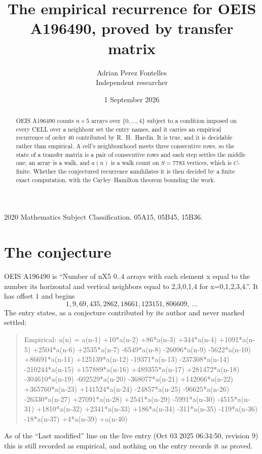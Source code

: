 \documentclass[11pt,a4paper]{article}
\title{The empirical recurrence for OEIS A196490, proved by transfer matrix}
\author{Adrian Perez Fontelles\\ \small Independent researcher}
\date{1 September 2026}
\theoremstyle{plain}
\theoremstyle{definition}
\begin{document}
\maketitle

\begin{abstract}
OEIS A196490 counts $n\times5$ arrays over $\{0,\dots,4\}$ subject to a condition imposed on
every CELL over a neighbour set the entry names, and it carries an empirical recurrence of
order $40$ contributed by R.~H.~Hardin. It is true, and it is decidable rather than
empirical. A cell's neighbourhood meets three consecutive rows, so the state of a transfer
matrix is a pair of consecutive rows and each step settles the middle one; an array is a
walk, and $a(n)$ is a walk count on $S=7783$ vertices, which is $C$-finite. Whether the
conjectured recurrence annihilates it is then decided by a finite exact computation, with the
Cayley--Hamilton theorem bounding the work.
\end{abstract}

\noindent\small 2020 Mathematics Subject Classification. 05A15, 05B45, 15B36.\normalsize

\section{The conjecture}

OEIS A196490 is ``Number of nX5 0..4 arrays with each element x equal to the number its horizontal and vertical neighbors equal to 2,3,0,1,4 for x=0,1,2,3,4.''. It has offset $1$ and begins
\[
1, 9, 69, 435, 2862, 18661, 123151, 806609,\ \dots
\]
The entry states, as a conjecture contributed by its author and never marked settled:
\begin{quote}
Empirical: a(n) = a(n-1) +10*a(n-2) +86*a(n-3) +344*a(n-4) +1091*a(n-5) +2504*a(n-6) +2535*a(n-7) -6549*a(n-8) -26096*a(n-9) -5622*a(n-10) +86691*a(n-11) +125139*a(n-12) -19371*a(n-13) -237308*a(n-14) -210244*a(n-15) +157889*a(n-16) +489355*a(n-17) +281472*a(n-18) -304610*a(n-19) -602529*a(n-20) -368077*a(n-21) +142066*a(n-22) +365760*a(n-23) +141524*a(n-24) -24857*a(n-25) -96625*a(n-26) -26330*a(n-27) +27091*a(n-28) +2541*a(n-29) -5991*a(n-30) -4515*a(n-31) +1810*a(n-32) +2341*a(n-33) +186*a(n-34) -311*a(n-35) -119*a(n-36) -18*a(n-37) +4*a(n-39) +a(n-40)
\end{quote}
As of the ``Last modified'' line on the live entry (Oct 03 2025 06:34:50, revision 9) this is still
recorded as empirical, and nothing on the entry records it as proved.
\end{document}
